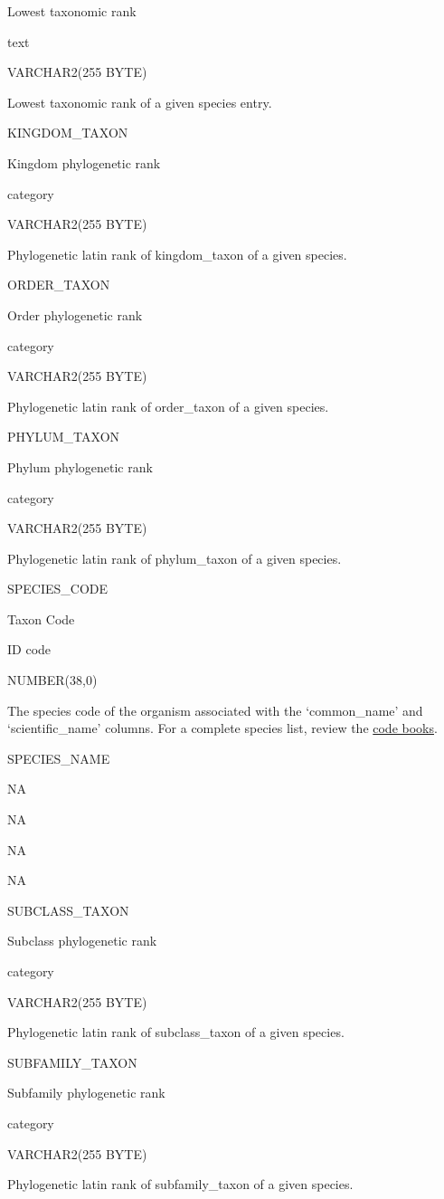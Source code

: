 \documentclass[
  letterpaper,
  oneside,
  open=any]{scrbook}
\begin{document}
Lowest taxonomic rank

text

VARCHAR2(255 BYTE)

Lowest taxonomic rank of a given species entry.

KINGDOM\_TAXON

Kingdom phylogenetic rank

category

VARCHAR2(255 BYTE)

Phylogenetic latin rank of kingdom\_taxon of a given species.

ORDER\_TAXON

Order phylogenetic rank

category

VARCHAR2(255 BYTE)

Phylogenetic latin rank of order\_taxon of a given species.

PHYLUM\_TAXON

Phylum phylogenetic rank

category

VARCHAR2(255 BYTE)

Phylogenetic latin rank of phylum\_taxon of a given species.

SPECIES\_CODE

Taxon Code

ID code

NUMBER(38,0)

The species code of the organism associated with the `common\_name' and
`scientific\_name' columns. For a complete species list, review the
\href{https://www.fisheries.noaa.gov/resource/document/groundfish-survey-species-code-manual-and-data-codes-manual}{code
books}.

SPECIES\_NAME

NA

NA

NA

NA

SUBCLASS\_TAXON

Subclass phylogenetic rank

category

VARCHAR2(255 BYTE)

Phylogenetic latin rank of subclass\_taxon of a given species.

SUBFAMILY\_TAXON

Subfamily phylogenetic rank

category

VARCHAR2(255 BYTE)

Phylogenetic latin rank of subfamily\_taxon of a given species.
\end{document}
